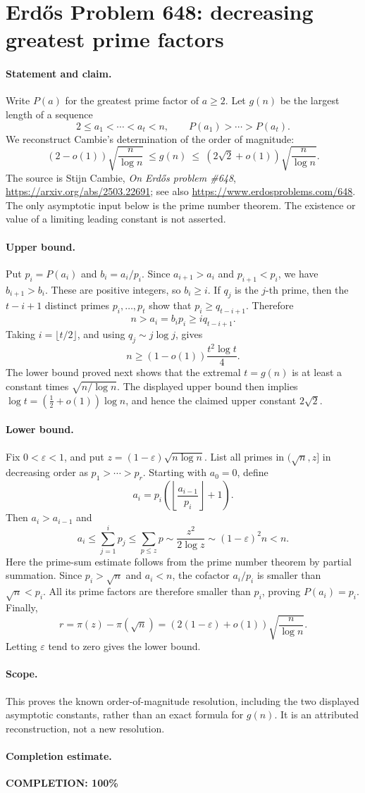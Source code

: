 \section*{Erd\H{o}s Problem 648: decreasing greatest prime factors}

\paragraph{Statement and claim.}
Write \(P(a)\) for the greatest prime factor of \(a\geq2\).
Let \(g(n)\) be the largest length of a sequence
\[
 2\leq a_1<\cdots<a_t<n,\qquad P(a_1)>\cdots>P(a_t).
\]
We reconstruct Cambie's determination of the order of magnitude:
\[
 (2-o(1))\sqrt{\frac n{\log n}}
 \ \leq g(n)\ \leq\
 (2\sqrt2+o(1))\sqrt{\frac n{\log n}}.
\]
The source is Stijn Cambie, \emph{On Erd\H{o}s problem \#648},
\url{https://arxiv.org/abs/2503.22691}; see also
\url{https://www.erdosproblems.com/648}.
The only asymptotic input below is the prime number theorem.
The existence or value of a limiting leading constant is not asserted.

\paragraph{Upper bound.}
Put \(p_i=P(a_i)\) and \(b_i=a_i/p_i\). Since \(a_{i+1}>a_i\) and
\(p_{i+1}<p_i\), we have \(b_{i+1}>b_i\). These are positive integers,
so \(b_i\geq i\). If \(q_j\) is the \(j\)-th prime, then the \(t-i+1\)
distinct primes \(p_i,\ldots,p_t\) show that \(p_i\geq q_{t-i+1}\).
Therefore
\[
 n>a_i=b_ip_i\geq i q_{t-i+1}.
\]
Taking \(i=\lfloor t/2\rfloor\), and using \(q_j\sim j\log j\), gives
\[
 n\geq(1-o(1))\frac{t^2\log t}{4}.
\]
The lower bound proved next shows that the extremal \(t=g(n)\)
is at least a constant times \(\sqrt{n/\log n}\).
The displayed upper bound then implies
\(\log t=(\tfrac12+o(1))\log n\), and hence the claimed
upper constant \(2\sqrt2\).

\paragraph{Lower bound.}
Fix \(0<\varepsilon<1\), and put
\(z=(1-\varepsilon)\sqrt{n\log n}\).
List all primes in \((\sqrt n,z]\) in decreasing order as
\(p_1>\cdots>p_r\). Starting with \(a_0=0\), define
\[
 a_i=p_i\left(\left\lfloor\frac{a_{i-1}}{p_i}\right\rfloor+1\right).
\]
Then \(a_i>a_{i-1}\) and
\[
 a_i\leq\sum_{j=1}^i p_j\leq\sum_{p\leq z}p
       \sim\frac{z^2}{2\log z}
       \sim(1-\varepsilon)^2n<n.
\]
Here the prime-sum estimate follows from the prime number theorem
by partial summation. Since \(p_i>\sqrt n\) and \(a_i<n\), the
cofactor \(a_i/p_i\) is smaller than \(\sqrt n<p_i\).
All its prime factors are therefore smaller than \(p_i\), proving
\(P(a_i)=p_i\). Finally,
\[
 r=\pi(z)-\pi(\sqrt n)
   =(2(1-\varepsilon)+o(1))\sqrt{\frac n{\log n}}.
\]
Letting \(\varepsilon\) tend to zero gives the lower bound.

\paragraph{Scope.}
This proves the known order-of-magnitude resolution, including the two
displayed asymptotic constants, rather than an exact formula for \(g(n)\).
It is an attributed reconstruction, not a new resolution.

\paragraph{Completion estimate.}
\textbf{COMPLETION: 100\%}
